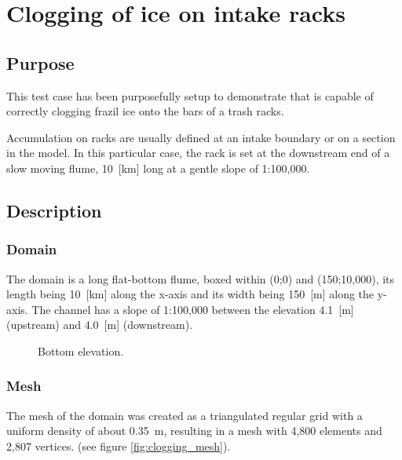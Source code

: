 \renewcommand{\labelitemi}{$\triangleright$}

\chapter{Clogging of ice on intake racks}
%
%
\section{Purpose}
This test case has been purposefully setup to demonstrate that \khione is capable of correctly clogging frazil ice onto the bars of a trash racks.\newline

Accumulation on racks are usually defined at an intake boundary or on a section in the model. In this particular case, the rack is set at the downstream end of a slow moving flume, 10~[km] long at a gentle slope of 1:100,000.\newline

\section{Description}

\subsection{Domain}
The domain is a long flat-bottom flume, boxed within (0;0) and (150;10,000), its length being 10~[km] along the x-axis and its width being 150~[m] along the y-axis. The channel has a slope of 1:100,000 between the elevation 4.1~[m] (upstream) and 4.0~[m] (downstream).

\begin{figure}[H]
    \begin{center}
    \end{center}
    \caption{Bottom elevation.}
    \label{fig:clogging_bottom}
\end{figure}

\subsection{Mesh}
The mesh of the domain was created as a triangulated regular grid with a uniform density of about 0.35~m, resulting in a mesh with 4,800 elements and 2,807 vertices. (see figure \ref{fig:clogging_mesh}).


